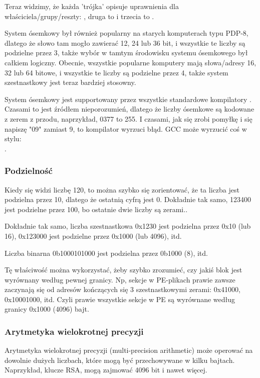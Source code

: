 Teraz widzimy, że każda 'trójka' opisuje uprawnienia dla właściciela/grupy/reszty: , druga to  i trzecia to .

System ósemkowy był również popularny na starych komputerach typu PDP-8, dlatego że słowo tam mogło zawierać 12, 24 lub
36 bit, i wszystkie te liczby są podzielne przez 3, także wybór w tamtym środowisku systemu ósemkowego był całkiem logiczny.
Obecnie, wszystkie popularne komputery mają słowa/adresy 16, 32 lub 64 bitowe, i wszystkie te liczby są podzielne przez 4,
także system szestnastkowy jest teraz bardziej stosowny.

System ósemkowy jest supportowany przez wszystkie standardowe kompilatory \CCpp{}.
Czasami to jest źródłem nieporozumień, dlatego że liczby ósemkowe są kodowane z zerem z przodu, naprzykład, 0377 to 255.
I czasami, jak się zrobi pomyłkę i się napiszę "09" zamiast 9, to kompilator wyrzuci błąd.
GCC może wyrzucić coś w stylu:\\
.


\subsubsection{Podzielność}

Kiedy się widzi liczbę 120, to można szybko się zorientować, że ta liczba jest podzielna przez 10, dlatego że ostatnią cyfrą jest 0.
Dokładnie tak samo, 123400 jest podzielne przez 100, bo ostatnie dwie liczby są zerami..

Dokładnie tak samo, liczba szestnastkowa 0x1230 jest podzielna przez 0x10 (lub 16), 0x123000 jest podzielne przez 0x1000 (lub 4096), itd.

Liczba binarna 0b1000101000 jest podzielna przez 0b1000 (8), itd.

Tę właściwość można wykorzystać, żeby szybko zrozumieć,
czy jakiś blok jest wyrównany według pewnej granicy.
Np, sekcje w \ac{PE}-plikach prawie zawsze zaczynają się od adresów kończących się 3 szestnastkowymi zerami:
0x41000, 0x10001000, itd.
Czyli prawie wszystkie sekcje w \ac{PE} są wyrównane według granicy 0x1000 (4096) bajt.

\subsubsection{Arytmetyka wielokrotnej precyzji}

Arytmetyka wielokrotnej precyzji (multi-precision arithmetic) może operować na dowolnie dużych liczbach,
które mogą być przechowywane w kilku bajtach.
Naprzykład, klucze RSA, mogą zajmować 4096 bit i nawet więcej.

